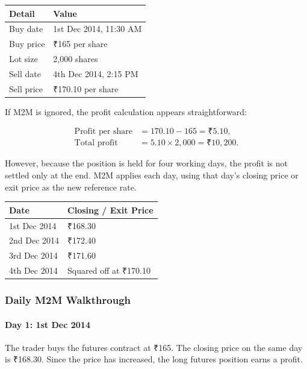 \documentclass[12pt,openany]{book}
\begin{document}
\begin{center}
\small
\begin{tabular}{|L{0.32\textwidth}|L{0.42\textwidth}|}
\hline
\textbf{Detail} & \textbf{Value} \\ \hline
Buy date & 1st Dec 2014, 11:30 AM \\ \hline
Buy price & ₹165 per share \\ \hline
Lot size & 2,000 shares \\ \hline
Sell date & 4th Dec 2014, 2:15 PM \\ \hline
Sell price & ₹170.10 per share \\ \hline
\end{tabular}
\end{center}

If M2M is ignored, the profit calculation appears straightforward:

\begin{align*}
\text{Profit per share} &= 170.10 - 165 = \text{₹}5.10, \\
\text{Total profit} &= 5.10 \times 2{,}000 = \text{₹}10{,}200.
\end{align*}

However, because the position is held for four working days, the profit is not settled only at the end. M2M applies each day, using that day's closing price or exit price as the new reference rate.

\begin{center}
\small
\begin{tabular}{|L{0.32\textwidth}|L{0.36\textwidth}|}
\hline
\textbf{Date} & \textbf{Closing / Exit Price} \\ \hline
1st Dec 2014 & ₹168.30 \\ \hline
2nd Dec 2014 & ₹172.40 \\ \hline
3rd Dec 2014 & ₹171.60 \\ \hline
4th Dec 2014 & Squared off at ₹170.10 \\ \hline
\end{tabular}
\end{center}

\subsubsection{Daily M2M Walkthrough}

\paragraph{Day 1: 1st Dec 2014}
The trader buys the futures contract at ₹165. The closing price on the same day is ₹168.30. Since the price has increased, the long futures position earns a profit.
\end{document}
